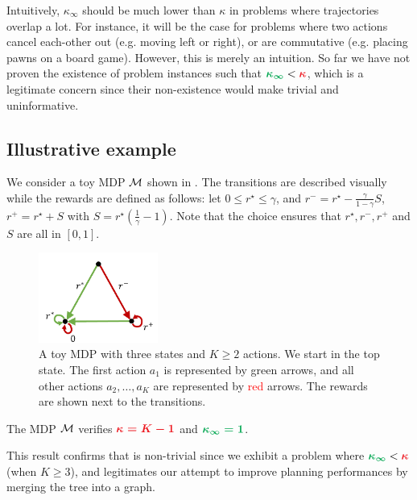 \documentclass[runningheads]{llncs}
\begin{document}
Intuitively, $\kappa_\infty$ should be much lower than $\kappa$ in problems where trajectories overlap a lot. For instance, it will be the case for problems where two actions cancel each-other out (e.g. moving left or right), or are commutative (e.g. placing pawns on a board game). However, this is merely an intuition. So far we have not proven the existence of problem instances such that $\hlgb{\kappa_\infty} < \hlrb{\kappa}$, which is a legitimate concern since their non-existence would make  trivial and uninformative.

\subsection{Illustrative example}

We consider a toy MDP $\mathcal{M}$ shown in . The transitions are described visually while the rewards are defined as follows: let $0\leq r^\star\leq \gamma$, and $ r^- = r^\star - \frac{\gamma}{1-\gamma} S$, $r^+ = r^\star + S$ with $S = r^\star\left(\frac{1}{\gamma} - 1\right).$ Note that the choice ensures that $r^\star, r^-, r^+$ and $S$ are all in $[0, 1]$.

\begin{figure}[htp]
    \centering
    \includegraphics[trim={0.5cm 0.0cm 0.3cm 0.6cm}, clip, width=0.35\textwidth]{img/mdp.pdf}
    \caption{A toy MDP with three states and $K \geq 2$ actions. We start in the top state. The first action $a_1$ is represented by \textcolor{OliveGreen}{green} arrows, and all other actions $a_2, \dots, a_K$ are represented by \textcolor{red}{red} arrows. The rewards are shown next to the transitions.}
    \label{fig:mdp}
\end{figure}

\begin{proposition}
\label{prop:illustrative-example}
The MDP $\mathcal{M}$ verifies $\hlrb{\kappa = K-1}$ and $\hlgb{\kappa_\infty = 1}$.
\end{proposition}
This result confirms that  is non-trivial since we exhibit a problem where $\hlgb{\kappa_\infty} < \hlrb{\kappa}$ (when $K\geq 3$), and legitimates our attempt to improve planning performances by merging the tree into a graph.
\end{document}
